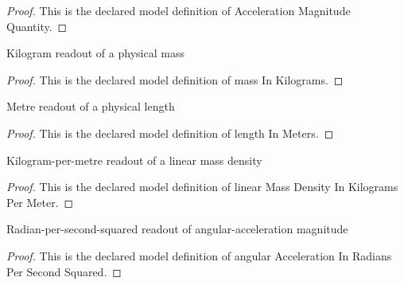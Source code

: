 \begin{proof}
  This is the declared model definition of Acceleration Magnitude Quantity.
\end{proof}
\begin{definition}
  \label{def:physics:phyx-mini-0697:phyxminiproblems-problemphyxmini0697-massinkilograms}
  Kilogram readout of a physical mass
\end{definition}
\begin{proof}
  This is the declared model definition of mass In Kilograms.
\end{proof}
\begin{definition}
  \label{def:physics:phyx-mini-0697:phyxminiproblems-problemphyxmini0697-lengthinmeters}
  Metre readout of a physical length
\end{definition}
\begin{proof}
  This is the declared model definition of length In Meters.
\end{proof}
\begin{definition}
  \label{def:physics:phyx-mini-0697:phyxminiproblems-problemphyxmini0697-linearmassdensityinkilogramspermeter}
  Kilogram-per-metre readout of a linear mass density
\end{definition}
\begin{proof}
  This is the declared model definition of linear Mass Density In Kilograms Per Meter.
\end{proof}
\begin{definition}
  \label{def:physics:phyx-mini-0697:phyxminiproblems-problemphyxmini0697-angularaccelerationinradianspersecondsquared}
  Radian-per-second-squared readout of angular-acceleration magnitude
\end{definition}
\begin{proof}
  This is the declared model definition of angular Acceleration In Radians Per Second Squared.
\end{proof}
